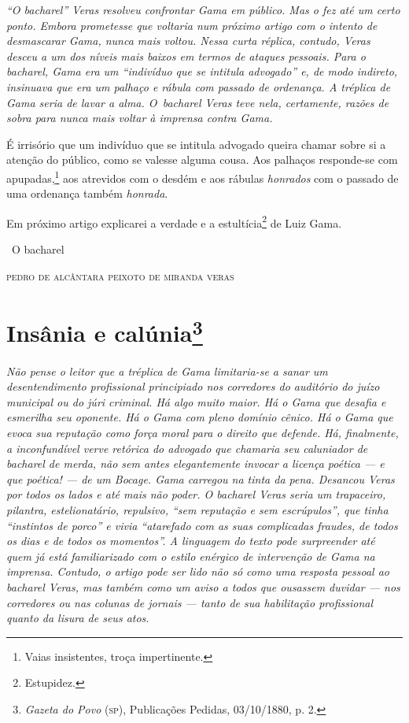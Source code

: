 \begin{resumo}
\emph{``O bacharel'' Veras resolveu confrontar Gama em público. Mas o fez
até um certo ponto. Embora prometesse que voltaria num próximo artigo
com o intento de desmascarar Gama, nunca mais voltou. Nessa curta
réplica, contudo, Veras desceu a um dos níveis mais baixos em termos de
ataques pessoais. Para o bacharel, Gama era um ``indivíduo que se
intitula advogado'' e, de modo indireto, insinuava que era um palhaço e
rábula com passado de ordenança. A tréplica de Gama seria de lavar a
alma. O~bacharel Veras teve nela, certamente, razões de sobra para nunca
mais voltar à imprensa contra Gama. }
\end{resumo}

É irrisório que um indivíduo que se intitula advogado queira chamar
sobre si a atenção do público, como se valesse alguma cousa. Aos
palhaços responde-se com apupadas,\footnote{Vaias insistentes, troça
  impertinente.} aos atrevidos com o desdém e aos rábulas
\emph{honrados} com o passado de uma ordenança também \emph{honrada}.

Em próximo artigo explicarei a verdade e a estultícia\footnote{
  Estupidez.} de Luiz Gama.\medskip

\hfill\ O bacharel

\hfill\textsc{pedro de alcântara peixoto de miranda veras}

\chapter{Insânia e calúnia\footnote{\emph{Gazeta do Povo}
  (\textsc{sp}), Publicações Pedidas, 03/10/1880, p. 2.}}

\begin{resumo}
\emph{Não pense o leitor que a tréplica de Gama limitaria-se a sanar um
desentendimento profissional principiado nos corredores do auditório do
juízo municipal ou do júri criminal. Há algo muito maior. Há o Gama
que desafia e esmerilha seu oponente. Há o Gama com pleno domínio
cênico. Há o Gama que evoca sua reputação como força moral para o
direito que defende. Há, finalmente, a inconfundível verve retórica do
advogado que chamaria seu caluniador de bacharel de merda, não sem antes
elegantemente invocar a licença poética --- e que poética! --- de um
Bocage. Gama carregou na tinta da pena. Desancou Veras por todos os
lados e até mais não poder. O bacharel Veras seria um trapaceiro,
pilantra, estelionatário, repulsivo, ``sem reputação e sem escrúpulos'',
que tinha ``instintos de porco'' e vivia ``atarefado com as suas
complicadas fraudes, de todos os dias e de todos os momentos''. A
linguagem do texto pode surpreender até quem já está familiarizado com o
estilo enérgico de intervenção de Gama na imprensa. Contudo, o artigo
pode ser lido não só como uma resposta pessoal ao bacharel Veras, mas
também como um aviso a todos que ousassem duvidar --- nos corredores ou
nas colunas de jornais --- tanto de sua habilitação profissional quanto
da lisura de seus atos.}
\end{resumo}

